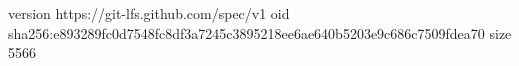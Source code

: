 version https://git-lfs.github.com/spec/v1
oid sha256:e893289fc0d7548fc8df3a7245c3895218ee6ae640b5203e9c686c7509fdea70
size 5566
